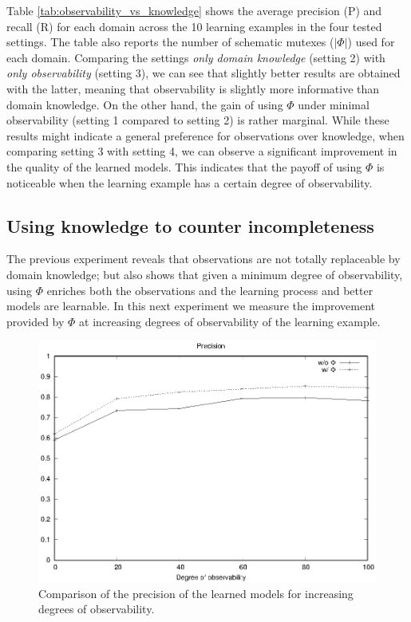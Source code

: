 \documentclass{article}
\begin{document}
Table \ref{tab:observability_vs_knowledge} shows the average precision (P) and recall (R) for each domain across the 10 learning examples in the four tested settings. The table also reports the number of schematic mutexes ($|\Phi|$) used for each domain. Comparing the settings \emph{only domain knowledge} (setting 2) with \emph{only observability} (setting 3), we can see that slightly better results are obtained with the latter, meaning that observability is slightly more informative than domain knowledge. On the other hand, the gain of using $\Phi$ under minimal observability (setting 1 compared to setting 2) is rather marginal. While these results might indicate a general preference for observations over knowledge, when comparing setting 3 with setting 4, we can observe a significant improvement in the quality of the learned models. This indicates that the payoff of using $\Phi$ is noticeable when the learning example has a certain degree of observability.


\subsection{Using knowledge to counter incompleteness}

The previous experiment reveals that observations are not totally replaceable by domain knowledge; but also shows that given a minimum degree of observability, using $\Phi$ enriches both the observations and the learning process and better models are learnable. In this next experiment we measure the improvement provided by $\Phi$ at increasing degrees of observability of the learning example.

\begin{figure}[hbt!]
	\centering
	\includegraphics[width=\linewidth]{figures/comparison_precision.eps}
	\caption{Comparison of the precision of the learned models for increasing degrees of observability.}
	\label{fig:comparison_precision}
\end{figure}
\end{document}
